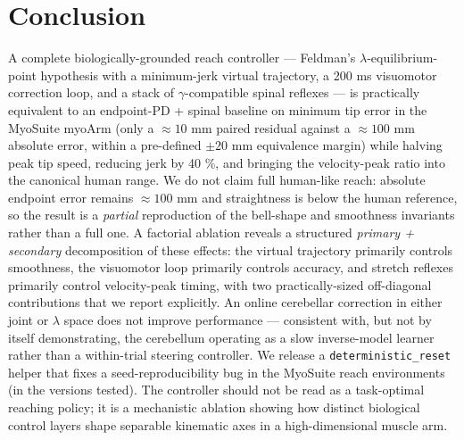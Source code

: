 \documentclass[sn-basic]{sn-jnl}
\begin{document}
\section{Conclusion}

A complete biologically-grounded reach controller --- Feldman's
$\lambda$-equilibrium-point hypothesis with a minimum-jerk virtual trajectory, a
200 ms visuomotor correction loop, and a stack of $\gamma$-compatible spinal
reflexes --- is practically equivalent to an endpoint-PD + spinal
baseline on minimum tip error in the MyoSuite myoArm (only a
\(\approx 10\) mm paired residual against a \(\approx 100\) mm absolute
error, within a pre-defined \(\pm 20\) mm equivalence margin) while
halving peak tip speed, reducing jerk by 40 \%, and bringing the
velocity-peak ratio into the canonical human range. We do not claim full
human-like reach: absolute endpoint error remains \(\approx 100\) mm and
straightness is below the human reference, so the result is a
\emph{partial} reproduction of the bell-shape and smoothness invariants
rather than a full one. A factorial ablation reveals a structured
\emph{primary + secondary} decomposition of these effects: the virtual
trajectory primarily controls smoothness, the visuomotor loop primarily
controls accuracy, and stretch reflexes primarily control velocity-peak
timing, with two practically-sized off-diagonal contributions that we
report explicitly. An online cerebellar correction in either joint or $\lambda$
space does not improve performance --- consistent with, but not by
itself demonstrating, the cerebellum operating as a slow inverse-model
learner rather than a within-trial steering controller. We release a
\texttt{deterministic\_reset} helper that fixes a seed-reproducibility
bug in the MyoSuite reach environments (in the versions tested). The
controller should not be read as a task-optimal reaching policy; it is a
mechanistic ablation showing how distinct biological control layers
shape separable kinematic axes in a high-dimensional muscle arm.



\end{document}
